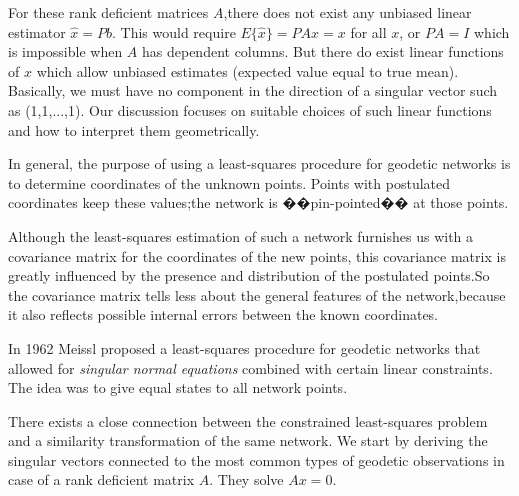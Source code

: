 \par
For these rank deficient matrices $A$,there does not exist any unbiased linear estimator $\hat{x} = Pb$. This would require $E\{\hat{x}\}= PAx = x$ for all $x$, or $PA = I$ which is impossible when $A$ has dependent columns. But there do exist linear functions of $x$ which allow unbiased estimates (expected value equal to true mean). Basically, we must have no component in the direction of a singular vector such as (1,1,...,1). Our discussion focuses on suitable choices of such linear functions and how to interpret them geometrically.
\par
In general, the purpose of using a least-squares procedure for geodetic networks is to determine coordinates of the unknown points. Points with postulated coordinates keep these values;the network is ��pin-pointed�� at those points.
\par
Although the least-squares estimation of such a network furnishes us with a covariance matrix for the coordinates of the new points, this covariance matrix is greatly influenced by the presence and distribution of the postulated points.So the covariance matrix tells less about the general features of the network,because it also reflects possible internal errors between the known coordinates.
\par
In 1962 Meissl proposed a least-squares procedure for geodetic networks that allowed for \emph{singular normal equations} combined with certain linear constraints. The idea was to give equal states to all network points.
\par
There exists a close connection between the constrained least-squares problem and a similarity transformation of the same network. We start by deriving the singular vectors connected to the most common types of geodetic observations in case of a rank deficient matrix $A$. They solve $Ax = 0$.	